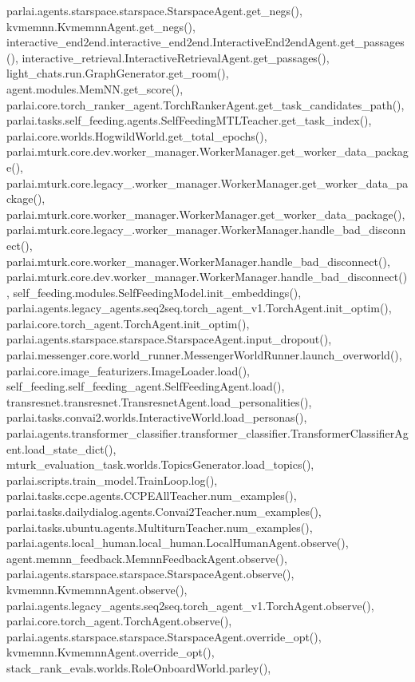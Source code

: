 parlai.\+agents.\+starspace.\+starspace.\+Starspace\+Agent.\+get\+\_\+negs(), kvmemnn.\+Kvmemnn\+Agent.\+get\+\_\+negs(), interactive\+\_\+end2end.\+interactive\+\_\+end2end.\+Interactive\+End2end\+Agent.\+get\+\_\+passages(), interactive\+\_\+retrieval.\+Interactive\+Retrieval\+Agent.\+get\+\_\+passages(), light\+\_\+chats.\+run.\+Graph\+Generator.\+get\+\_\+room(), agent.\+modules.\+Mem\+N\+N.\+get\+\_\+score(), parlai.\+core.\+torch\+\_\+ranker\+\_\+agent.\+Torch\+Ranker\+Agent.\+get\+\_\+task\+\_\+candidates\+\_\+path(), parlai.\+tasks.\+self\+\_\+feeding.\+agents.\+Self\+Feeding\+M\+T\+L\+Teacher.\+get\+\_\+task\+\_\+index(), parlai.\+core.\+worlds.\+Hogwild\+World.\+get\+\_\+total\+\_\+epochs(), parlai.\+mturk.\+core.\+dev.\+worker\+\_\+manager.\+Worker\+Manager.\+get\+\_\+worker\+\_\+data\+\_\+package(), parlai.\+mturk.\+core.\+legacy\+\_.\+worker\+\_\+manager.\+Worker\+Manager.\+get\+\_\+worker\+\_\+data\+\_\+package(), parlai.\+mturk.\+core.\+worker\+\_\+manager.\+Worker\+Manager.\+get\+\_\+worker\+\_\+data\+\_\+package(), parlai.\+mturk.\+core.\+legacy\+\_.\+worker\+\_\+manager.\+Worker\+Manager.\+handle\+\_\+bad\+\_\+disconnect(), parlai.\+mturk.\+core.\+worker\+\_\+manager.\+Worker\+Manager.\+handle\+\_\+bad\+\_\+disconnect(), parlai.\+mturk.\+core.\+dev.\+worker\+\_\+manager.\+Worker\+Manager.\+handle\+\_\+bad\+\_\+disconnect(), self\+\_\+feeding.\+modules.\+Self\+Feeding\+Model.\+init\+\_\+embeddings(), parlai.\+agents.\+legacy\+\_\+agents.\+seq2seq.\+torch\+\_\+agent\+\_\+v1.\+Torch\+Agent.\+init\+\_\+optim(), parlai.\+core.\+torch\+\_\+agent.\+Torch\+Agent.\+init\+\_\+optim(), parlai.\+agents.\+starspace.\+starspace.\+Starspace\+Agent.\+input\+\_\+dropout(), parlai.\+messenger.\+core.\+world\+\_\+runner.\+Messenger\+World\+Runner.\+launch\+\_\+overworld(), parlai.\+core.\+image\+\_\+featurizers.\+Image\+Loader.\+load(), self\+\_\+feeding.\+self\+\_\+feeding\+\_\+agent.\+Self\+Feeding\+Agent.\+load(), transresnet.\+transresnet.\+Transresnet\+Agent.\+load\+\_\+personalities(), parlai.\+tasks.\+convai2.\+worlds.\+Interactive\+World.\+load\+\_\+personas(), parlai.\+agents.\+transformer\+\_\+classifier.\+transformer\+\_\+classifier.\+Transformer\+Classifier\+Agent.\+load\+\_\+state\+\_\+dict(), mturk\+\_\+evaluation\+\_\+task.\+worlds.\+Topics\+Generator.\+load\+\_\+topics(), parlai.\+scripts.\+train\+\_\+model.\+Train\+Loop.\+log(), parlai.\+tasks.\+ccpe.\+agents.\+C\+C\+P\+E\+All\+Teacher.\+num\+\_\+examples(), parlai.\+tasks.\+dailydialog.\+agents.\+Convai2\+Teacher.\+num\+\_\+examples(), parlai.\+tasks.\+ubuntu.\+agents.\+Multiturn\+Teacher.\+num\+\_\+examples(), parlai.\+agents.\+local\+\_\+human.\+local\+\_\+human.\+Local\+Human\+Agent.\+observe(), agent.\+memnn\+\_\+feedback.\+Memnn\+Feedback\+Agent.\+observe(), parlai.\+agents.\+starspace.\+starspace.\+Starspace\+Agent.\+observe(), kvmemnn.\+Kvmemnn\+Agent.\+observe(), parlai.\+agents.\+legacy\+\_\+agents.\+seq2seq.\+torch\+\_\+agent\+\_\+v1.\+Torch\+Agent.\+observe(), parlai.\+core.\+torch\+\_\+agent.\+Torch\+Agent.\+observe(), parlai.\+agents.\+starspace.\+starspace.\+Starspace\+Agent.\+override\+\_\+opt(), kvmemnn.\+Kvmemnn\+Agent.\+override\+\_\+opt(), stack\+\_\+rank\+\_\+evals.\+worlds.\+Role\+Onboard\+World.\+parley(), 
